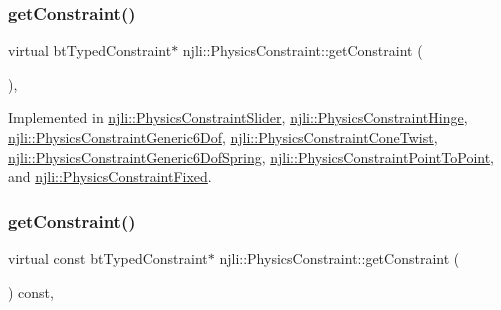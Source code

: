 \mbox{\label{classnjli_1_1_physics_constraint_a0a22d54c2c896af49fa57db9be76a5da}} 
\subsubsection{\texorpdfstring{get\+Constraint()}{getConstraint()}\hspace{0.1cm}{\footnotesize\ttfamily [1/2]}}
{\footnotesize\ttfamily virtual bt\+Typed\+Constraint$\ast$ njli\+::\+Physics\+Constraint\+::get\+Constraint (\begin{DoxyParamCaption}{ }\end{DoxyParamCaption})\hspace{0.3cm}{\ttfamily [protected]}, {}}



Implemented in \mbox{\hyperlink{classnjli_1_1_physics_constraint_slider_a0de9fb59fa29e7e1766c6e0e02ef37e3}{njli\+::\+Physics\+Constraint\+Slider}}, \mbox{\hyperlink{classnjli_1_1_physics_constraint_hinge_a0e6fd626089d0df9061f58e05bf81cdc}{njli\+::\+Physics\+Constraint\+Hinge}}, \mbox{\hyperlink{classnjli_1_1_physics_constraint_generic6_dof_a0591b18e41f1e1e349ba3cef3e8cf4a4}{njli\+::\+Physics\+Constraint\+Generic6\+Dof}}, \mbox{\hyperlink{classnjli_1_1_physics_constraint_cone_twist_a50abadf06a0a68049c69a905cf09d1c7}{njli\+::\+Physics\+Constraint\+Cone\+Twist}}, \mbox{\hyperlink{classnjli_1_1_physics_constraint_generic6_dof_spring_aa90bf42f88d0314d834a6b3d670ba90d}{njli\+::\+Physics\+Constraint\+Generic6\+Dof\+Spring}}, \mbox{\hyperlink{classnjli_1_1_physics_constraint_point_to_point_ac6660242268a76ff271f041fe22ea52a}{njli\+::\+Physics\+Constraint\+Point\+To\+Point}}, and \mbox{\hyperlink{classnjli_1_1_physics_constraint_fixed_aacec008844d5aa73eb2763855607a688}{njli\+::\+Physics\+Constraint\+Fixed}}.

\mbox{\label{classnjli_1_1_physics_constraint_af4cb8c0158a044f75fe61f89cc278338}} 
\subsubsection{\texorpdfstring{get\+Constraint()}{getConstraint()}\hspace{0.1cm}{\footnotesize\ttfamily [2/2]}}
{\footnotesize\ttfamily virtual const bt\+Typed\+Constraint$\ast$ njli\+::\+Physics\+Constraint\+::get\+Constraint (\begin{DoxyParamCaption}{ }\end{DoxyParamCaption}) const\hspace{0.3cm}{\ttfamily [protected]}, {}}



